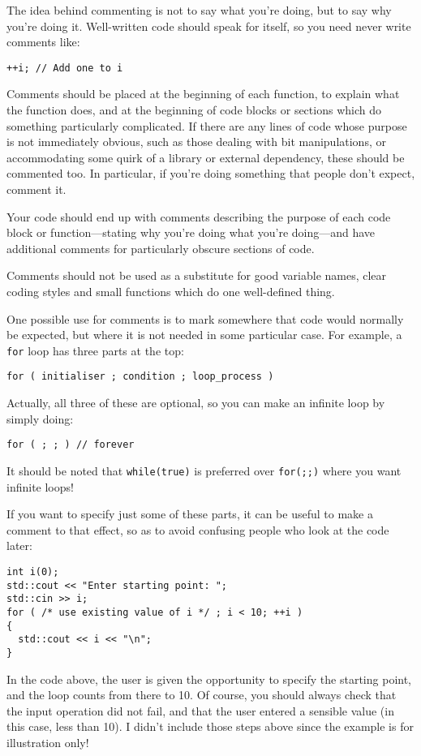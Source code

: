 \documentclass[a4paper]{scrartcl}
\begin{document}
The idea behind commenting is not to say what you're doing, but to say why you're doing it. Well-written code should speak for itself, so you need never write comments like:

\begin{verbatim}
++i; // Add one to i
\end{verbatim}

Comments should be placed at the beginning of each function, to explain what the function does, and at the beginning of code blocks or sections which do something particularly complicated. If there are any lines of code whose purpose is not immediately obvious, such as those dealing with bit manipulations, or accommodating some quirk of a library or external dependency, these should be commented too. In particular, if you're doing something that people don't expect, comment it.

Your code should end up with comments describing the purpose of each code block or function---stating why you're doing what you're doing---and have additional comments for particularly obscure sections of code.

Comments should not be used as a substitute for good variable names, clear coding styles and small functions which do one well-defined thing.

One possible use for comments is to mark somewhere that code would normally be expected, but where it is not needed in some particular case. For example, a \texttt{for} loop has three parts at the top:
\begin{verbatim}
for ( initialiser ; condition ; loop_process )
\end{verbatim}
Actually, all three of these are optional, so you can make an infinite loop by simply doing:
\begin{verbatim}
for ( ; ; ) // forever
\end{verbatim}
It should be noted that \texttt{while(true)} is preferred over \texttt{for(;;)} where you want infinite loops!

If you want to specify just some of these parts, it can be useful to make a comment to that effect, so as to avoid confusing people who look at the code later:
\begin{verbatim}
int i(0);
std::cout << "Enter starting point: ";
std::cin >> i;
for ( /* use existing value of i */ ; i < 10; ++i )
{
  std::cout << i << "\n";
}
\end{verbatim}

In the code above, the user is given the opportunity to specify the starting point, and the loop counts from there to 10. Of course, you should always check that the input operation did not fail, and that the user entered a sensible value (in this case, less than 10). I didn't include those steps above since the example is for illustration only!
\end{document}
